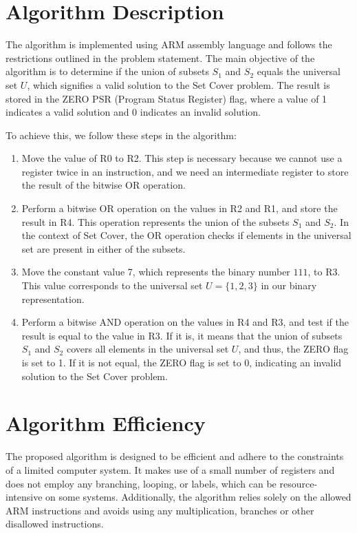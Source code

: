 \section{Algorithm Description}

The algorithm is implemented using ARM assembly language and follows the restrictions outlined in the problem statement. The main objective of the algorithm is to determine if the union of subsets $S_1$ and $S_2$ equals the universal set $U$, which signifies a valid solution to the Set Cover problem. The result is stored in the ZERO PSR (Program Status Register) flag, where a value of 1 indicates a valid solution and 0 indicates an invalid solution.

To achieve this, we follow these steps in the algorithm:

\begin{enumerate}
    \item Move the value of R0 to R2. This step is necessary because we cannot use a register twice in an instruction, and we need an intermediate register to store the result of the bitwise OR operation.
    \item Perform a bitwise OR operation on the values in R2 and R1, and store the result in R4. This operation represents the union of the subsets $S_1$ and $S_2$. In the context of Set Cover, the OR operation checks if elements in the universal set are present in either of the subsets.
    \item Move the constant value 7, which represents the binary number $111$, to R3. This value corresponds to the universal set $U = \{1, 2, 3\}$ in our binary representation.
    \item Perform a bitwise AND operation on the values in R4 and R3, and test if the result is equal to the value in R3. If it is, it means that the union of subsets $S_1$ and $S_2$ covers all elements in the universal set $U$, and thus, the ZERO flag is set to 1. If it is not equal, the ZERO flag is set to 0, indicating an invalid solution to the Set Cover problem.
\end{enumerate}

\section{Algorithm Efficiency}

The proposed algorithm is designed to be efficient and adhere to the constraints of a limited computer system. It makes use of a small number of registers and does not employ any branching, looping, or labels, which can be resource-intensive on some systems. Additionally, the algorithm relies solely on the allowed ARM instructions and avoids using any multiplication, branches or other disallowed instructions.

